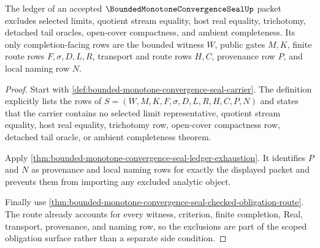 \begin{theorem}
\label{thm:bounded-monotone-convergence-seal-ledger-exclusion-scope}
The ledger of an accepted $\BoundedMonotoneConvergenceSealUp$ packet excludes selected limits, quotient stream equality, host real equality, trichotomy, detached tail oracles, open-cover compactness, and ambient completeness. Its only completion-facing rows are the bounded witness $W$, public gates $M,K$, finite route rows $F,\sigma,D,L,R$, transport and route rows $H,C$, provenance row $P$, and local naming row $N$.
\end{theorem}
\begin{proof}
Start with \autoref{def:bounded-monotone-convergence-seal-carrier}. The definition explicitly lists the rows of $S=(W,M,K,F,\sigma,D,L,R,H,C,P,N)$ and states that the carrier contains no selected limit representative, quotient stream equality, host real equality, trichotomy row, open-cover compactness row, detached tail oracle, or ambient completeness theorem.

Apply \autoref{thm:bounded-monotone-convergence-seal-ledger-exhaustion}. It identifies $P$ and $N$ as provenance and local naming rows for exactly the displayed packet and prevents them from importing any excluded analytic object.

Finally use \autoref{thm:bounded-monotone-convergence-seal-checked-obligation-route}. The route already accounts for every witness, criterion, finite completion, Real, transport, provenance, and naming row, so the exclusions are part of the scoped obligation surface rather than a separate side condition.
\end{proof}

